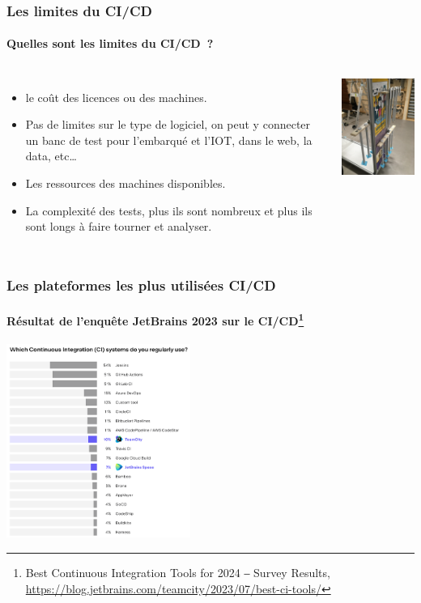 \documentclass{beamer}
\begin{document}
    \begin{frame}
        \frametitle{Les limites du CI/CD}
        \framesubtitle{Quelles sont les limites du CI/CD~?}
        \transdissolve
        \pause
        \begin{columns}
            \begin{itemize}
                \item le coût des licences ou des machines.
                \item Pas de limites sur le type de logiciel, on peut y connecter un banc de test pour l'embarqué et l'IOT, dans le web, la data, etc\ldots
                \item Les ressources des machines disponibles.
                \item La complexité des tests, plus ils sont nombreux et plus ils sont longs à faire tourner et analyser.
            \end{itemize}
            \centering
            \includegraphics[width=5cm]{image/somfy-test-bench.jpg}
        \end{columns}
    \end{frame}

    \begin{frame}
        \frametitle{Les plateformes les plus utilisées CI/CD}
        \framesubtitle{Résultat de l'enquête JetBrains 2023 sur le CI/CD\footnote{Best Continuous Integration Tools for 2024 ‒ Survey Results, \url{https://blog.jetbrains.com/teamcity/2023/07/best-ci-tools/}}}
        \transdissolve
        \centering
        \includegraphics[width=6cm]{image/ci-jetbrains-survey.png}
    \end{frame}
\end{document}
